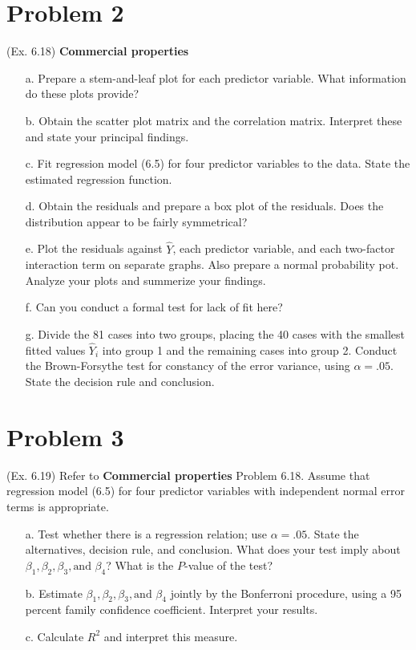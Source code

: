 \documentclass[10pt]{report}
\begin{document}
\section*{Problem 2}
(Ex. 6.18) \textbf{Commercial properties}
\begin{enumerate}
	\item [a.]
	Prepare a stem-and-leaf plot for each predictor variable. What information do these plots provide?

	\item [b.]
	Obtain the scatter plot matrix and the correlation matrix. Interpret these and state your principal findings.
	
	\item [c.]
	Fit regression model (6.5) for four predictor variables to the data. State the estimated regression function. 
	
	\item [d.]
	Obtain the residuals and prepare a box plot of the residuals. Does the distribution appear to be fairly symmetrical?
	
	\item [e.]
	Plot the residuals against $\hat{Y}$, each predictor variable, and each two-factor interaction term on separate graphs. Also prepare a normal probability pot. Analyze your plots and summerize your findings.
	
	\item [f.]
	Can you conduct a formal test for lack of fit here?
	
	\item [g.]
	Divide the 81 cases into two groups, placing the 40 cases with the smallest fitted values $\hat{Y}_i$ into group 1 and the remaining cases into group 2. Conduct the Brown-Forsythe test for constancy of the error variance, using $\alpha = .05$. State the decision rule and conclusion.
\end{enumerate}

\section*{Problem 3}
(Ex. 6.19) Refer to \textbf{Commercial properties} Problem 6.18. Assume that regression model (6.5) for four predictor variables with independent normal error terms is appropriate.
\begin{enumerate}
	\item [a.]
	Test whether there is a regression relation; use $\alpha = .05$. State the alternatives, decision rule, and conclusion. What does your test imply about $\beta_1, \beta_2, \beta_3, \text{and } \beta_4$? What is the $P$-value of the test?
	
	\item [b.]
	Estimate $\beta_1, \beta_2, \beta_3, \text{and } \beta_4$ jointly by the Bonferroni procedure, using a 95 percent family confidence coefficient. Interpret your results.
	
	\item [c.]
	Calculate $R^2$ and interpret this measure.
\end{enumerate}
\end{document}
